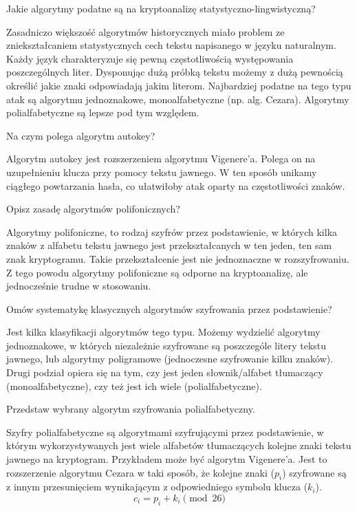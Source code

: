 \documentclass[answers,11pt]{exam}
\begin{document}
\begin{questions}
\question Jakie algorytmy podatne są na kryptoanalizę statystyczno-lingwistyczną?
\begin{solution}
Zasadniczo większość algorytmów historycznych miało problem ze zniekształcaniem statystycznych cech tekstu napisanego w języku naturalnym. Każdy język charakteryzuje się pewną częstotliwością występowania poszczególnych liter. Dysponując dużą próbką tekstu możemy z dużą pewnością określić jakie znaki odpowiadają jakim literom. Najbardziej podatne na tego typu atak są algorytmu jednoznakowe, monoalfabetyczne (np. alg. Cezara). Algorytmy polialfabetyczne są lepsze pod tym względem. 
\end{solution}

\question Na czym polega algorytm autokey?
\begin{solution}
Algorytm autokey jest rozszerzeniem algorytmu Vigenere'a. Polega on na uzupełnieniu klucza przy pomocy tekstu jawnego. W ten sposób unikamy ciągłego powtarzania hasła, co ułatwiłoby atak oparty na częstotliwości znaków. 
\end{solution}

\question Opisz zasadę algorytmów polifonicznych?
\begin{solution}
Algorytmy polifoniczne, to rodzaj szyfrów przez podstawienie, w których kilka znaków z alfabetu tekstu jawnego jest przekształcanych w ten jeden, ten sam znak kryptogramu. Takie przekształcenie jest nie jednoznaczne w rozszyfrowaniu. Z tego powodu algorytmy polifoniczne są odporne na kryptoanalizę, ale jednocześnie trudne w stosowaniu.
\end{solution}

\question Omów systematykę klasycznych algorytmów szyfrowania przez podstawienie?
\begin{solution}
Jest kilka klasyfikacji algorytmów tego typu. Możemy wydzielić algorytmy jednoznakowe, w których niezależnie szyfrowane są poszczególe litery tekstu jawnego, lub algorytmy poligramowe (jednoczesne szyfrowanie kilku znaków). 
Drugi podział opiera się na tym, czy jest jeden słownik/alfabet tłumaczący (monoalfabetyczne), czy też jest ich wiele (polialfabetyczne). 
\end{solution}

\question Przedstaw wybrany algorytm szyfrowania polialfabetyczny.
\begin{solution}
Szyfry polialfabetyczne są algorytmami szyfrującymi przez podstawienie, w którym wykorzystywanych jest wiele alfabetów tłumaczących kolejne znaki tekstu jawnego na kryptogram. Przykładem może być algorytm Vigenere'a. Jest to rozszerzenie algorytmu Cezara w taki sposób, że kolejne znaki  ($p_i$) szyfrowane są z innym przesunięciem wynikającym z odpowiedniego symbolu klucza ($k_i$).
\begin{equation}
c_i = p_i + k_i \pmod{26}
\end{equation}
\end{solution}


\end{questions}
\end{document}
